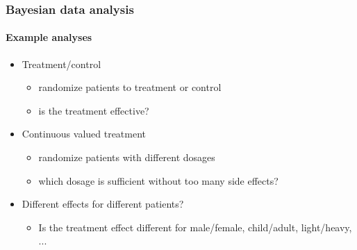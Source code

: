 \documentclass[english]{beamer}
\begin{document}
  

\begin{frame}
  \frametitle{Bayesian data analysis}  %
  \framesubtitle{Example analyses}
  \begin{itemize}
  \item Treatment/control
    \begin{itemize}
    \item randomize patients to treatment or control
    \item is the treatment effective?
    \end{itemize}
    \pause
  \item Continuous valued treatment
    \begin{itemize}
    \item randomize patients with different dosages
    \item which dosage is sufficient without too many side effects?
    \end{itemize}
    \pause
  \item Different effects for different patients?
    \begin{itemize}
    \item Is the treatment effect different for male/female, child/adult, light/heavy, ...
    \end{itemize}
  \end{itemize}

\end{frame}
\end{document}
